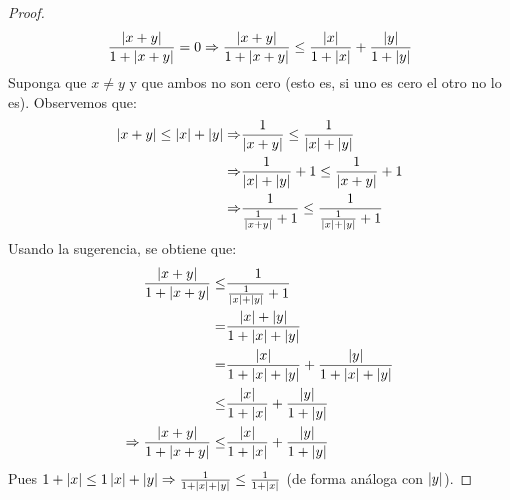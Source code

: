 \documentclass[12pt]{article}
\begin{document}
\begin{enumerate}
\begin{proof}
        \begin{equation*}
                \frac{\left| x+y \right|}{1+\left| x+y \right|}=0
                \Rightarrow\frac{\left| x+y \right|}{1+\left| x+y \right|}\leq\frac{\left| x \right|}{1+\left| x \right|}+\frac{\left| y \right|}{1+\left| y \right|}
        \end{equation*}
        Suponga que $x\neq y$ y que ambos no son cero (esto es, si uno es cero el otro no lo es). Observemos que:
        \begin{equation*}
            \begin{split}
                \left| x+y \right|\leq\left| x \right|+\left| y \right|\Rightarrow&\frac{1}{\left| x+y \right|}\leq\frac{1}{\left| x \right|+\left| y \right|}\\
                \Rightarrow&\frac{1}{\left| x \right|+\left| y \right|}+1\leq\frac{1}{\left| x+y \right|}+1\\
                \Rightarrow&\frac{1}{\frac{1}{\left| x+y \right|}+1}\leq\frac{1}{\frac{1}{\left| x \right|+\left| y \right|}+1}
            \end{split}
        \end{equation*}
        Usando la sugerencia, se obtiene que:
        \begin{equation*}
            \begin{split}
                \frac{\left| x+y \right|}{1+\left| x+y \right|}\leq&\frac{1}{\frac{1}{\left| x \right|+\left| y \right|}+1}\\
                =&\frac{\left| x \right|+\left| y \right|}{1+\left| x \right|+\left| y \right|}\\
                =&\frac{\left| x \right|}{1+\left| x \right|+\left| y \right|}+\frac{\left| y \right|}{1+\left| x \right|+\left| y \right|}\\
                \leq&\frac{\left| x \right|}{1+\left| x \right|}+\frac{\left| y \right|}{1+\left| y \right|}\\
                \Rightarrow\frac{\left| x+y \right|}{1+\left| x+y \right|}\leq&\frac{\left| x \right|}{1+\left| x \right|}+\frac{\left| y \right|}{1+\left| y \right|}
            \end{split}
        \end{equation*}
        Pues $1+\left| x \right|\leq1\left| x \right|+\left| y \right|\Rightarrow\frac{1}{1+\left| x \right|+\left| y \right|}\leq\frac{1}{1+\left| x \right|}$ (de forma análoga con $\left| y \right|$).


\end{proof}
\end{enumerate}
\end{document}
